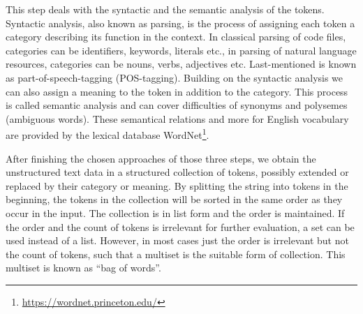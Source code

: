 \documentclass[article,type=msc,colorback,accentcolor=tud7b]{tudthesis}
\begin{document}
\begin{itemize}
        This step deals with the syntactic and the semantic analysis of the tokens. Syntactic analysis, also known as parsing, is the process of assigning each token a category describing its function in the context. In classical parsing of code files, categories can be identifiers, keywords, literals etc., in parsing of natural language resources, categories can be nouns, verbs, adjectives etc. Last-mentioned is known as part-of-speech-tagging (POS-tagging). Building on the syntactic analysis we can also assign a meaning to the token in addition to the category. This process is called semantic analysis and can cover difficulties of synonyms and polysemes (ambiguous words). These semantical relations and more for English vocabulary are provided by the lexical database WordNet\footnote{\url{https://wordnet.princeton.edu/}}.
    \end{itemize}
    After finishing the chosen approaches of those three steps, we obtain the unstructured text data in a structured collection of tokens, possibly extended or replaced by their category or meaning. By splitting the string into tokens in the beginning, the tokens in the collection will be sorted in the same order as they occur in the input. The collection is in list form and the order is maintained. If the order and the count of tokens is irrelevant for further evaluation, a set can be used instead of a list. However, in most cases just the order is irrelevant but not the count of tokens, such that a multiset is the suitable form of collection. This multiset is known as “bag of words”.
  
\end{document}
